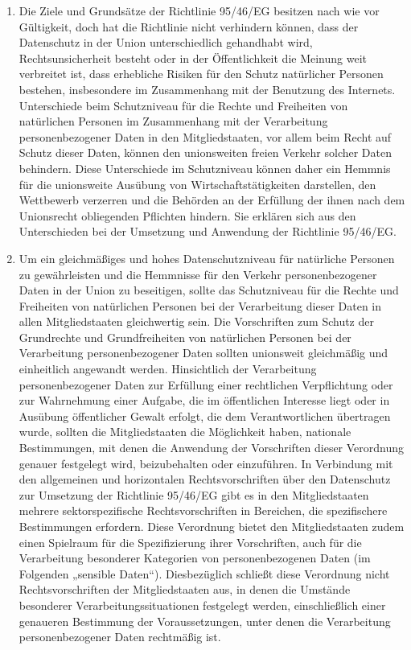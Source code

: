 \begin{enumerate}

   \item Die Ziele und Grundsätze der Richtlinie 95/46/EG besitzen nach wie vor Gültigkeit, doch hat die Richtlinie
    nicht verhindern können, dass der Datenschutz in der Union unterschiedlich gehandhabt wird, Rechtsunsicherheit
    besteht oder in der Öffentlichkeit die Meinung weit verbreitet ist, dass erhebliche Risiken für den Schutz
    natürlicher Personen bestehen, insbesondere im Zusammenhang mit der Benutzung des Internets. Unterschiede beim
    Schutzniveau für die Rechte und Freiheiten von natürlichen Personen im Zusammenhang mit der Verarbeitung
    personenbezogener Daten in den Mitgliedstaaten, vor allem beim Recht auf Schutz dieser Daten, können den
    unionsweiten freien Verkehr solcher Daten behindern. Diese Unterschiede im Schutzniveau können daher ein Hemmnis
    für die unionsweite Ausübung von Wirtschaftstätigkeiten darstellen, den Wettbewerb verzerren und die Behörden an
    der Erfüllung der ihnen nach dem Unionsrecht obliegenden Pflichten hindern. Sie erklären sich aus den Unterschieden
    bei der Umsetzung und Anwendung der Richtlinie 95/46/EG.%
   \label{itm:eg-9}
   

   \item Um ein gleichmäßiges und hohes Datenschutzniveau für natürliche Personen zu gewährleisten und die Hemmnisse für
    den Verkehr personenbezogener Daten in der Union zu beseitigen, sollte das Schutzniveau für die Rechte und
    Freiheiten von natürlichen Personen bei der Verarbeitung dieser Daten in allen Mitgliedstaaten gleichwertig sein.
    Die Vorschriften zum Schutz der Grundrechte und Grundfreiheiten von natürlichen Personen bei der Verarbeitung
    personenbezogener Daten sollten unionsweit gleichmäßig und einheitlich angewandt werden. Hinsichtlich der
    Verarbeitung personenbezogener Daten zur Erfüllung einer rechtlichen Verpflichtung oder zur Wahrnehmung einer
    Aufgabe, die im öffentlichen Interesse liegt oder in Ausübung öffentlicher Gewalt erfolgt, die dem Verantwortlichen
    übertragen wurde, sollten die Mitgliedstaaten die Möglichkeit haben, nationale Bestimmungen, mit denen die
    Anwendung der Vorschriften dieser Verordnung genauer festgelegt wird, beizubehalten oder einzuführen. In Verbindung
    mit den allgemeinen und horizontalen Rechtsvorschriften über den Datenschutz zur Umsetzung der Richtlinie 95/46/EG
    gibt es in den Mitgliedstaaten mehrere sektorspezifische Rechtsvorschriften in Bereichen, die spezifischere
    Bestimmungen erfordern. Diese Verordnung bietet den Mitgliedstaaten zudem einen Spielraum für die Spezifizierung
    ihrer Vorschriften, auch für die Verarbeitung besonderer Kategorien von personenbezogenen Daten
    (im Folgenden „sensible Daten“). Diesbezüglich schließt diese Verordnung nicht Rechtsvorschriften der
    Mitgliedstaaten aus, in denen die Umstände besonderer Verarbeitungssituationen festgelegt werden, einschließlich
    einer genaueren Bestimmung der Voraussetzungen, unter denen die Verarbeitung personenbezogener Daten rechtmäßig
    ist.%
   \label{itm:eg-10}
   

\end{enumerate}
